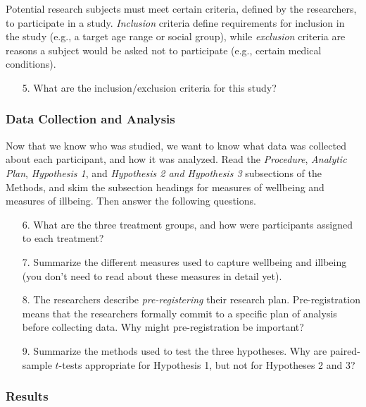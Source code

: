 \documentclass[12pt]{article}
\begin{document}
\noindent Potential research subjects must meet certain criteria, defined by the researchers, to participate in a study. \textit{Inclusion} criteria define requirements for inclusion in the study (e.g., a target age range or social group), while \textit{exclusion} criteria are reasons a subject would be asked not to participate (e.g., certain medical conditions). 

\begin{enumerate}
    \item[5.] What are the inclusion/exclusion criteria for this study?
\end{enumerate}


\subsubsection*{Data Collection and Analysis}

Now that we know who was studied, we want to know what data was collected about each participant, and how it was analyzed. Read the \textit{Procedure}, \textit{Analytic Plan}, \textit{Hypothesis 1}, and \textit{Hypothesis 2 and Hypothesis 3} subsections of the Methods, and skim the subsection headings for measures of wellbeing and measures of illbeing. Then answer the following questions.

\begin{enumerate}
    \item[6.] What are the three treatment groups, and how were participants assigned to each treatment?
    
    \item[7.] Summarize the different measures used to capture wellbeing and illbeing (you don't need to read about these measures in detail yet).
    
    \item[8.] The researchers describe \textit{pre-registering} their research plan. Pre-registration means that the researchers formally commit to a specific plan of analysis before collecting data. Why might pre-registration be important?
    
    \item[9.] Summarize the methods used to test the three hypotheses. Why are paired-sample $t$-tests appropriate for Hypothesis 1, but not for Hypotheses 2 and 3?
\end{enumerate}


\subsubsection*{Results}
\end{document}
